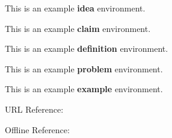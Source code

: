 \begin{idea}
  This is an example \textbf{idea} environment.
\end{idea}

\begin{claim}
  This is an example \textbf{claim} environment.
\end{claim}

\begin{definition}
  This is an example \textbf{definition} environment.
\end{definition}

\begin{problem}
  This is an example \textbf{problem} environment.
\end{problem}

\begin{example}
  This is an example \textbf{example} environment.
\end{example}

URL Reference: 

Offline Reference: 
